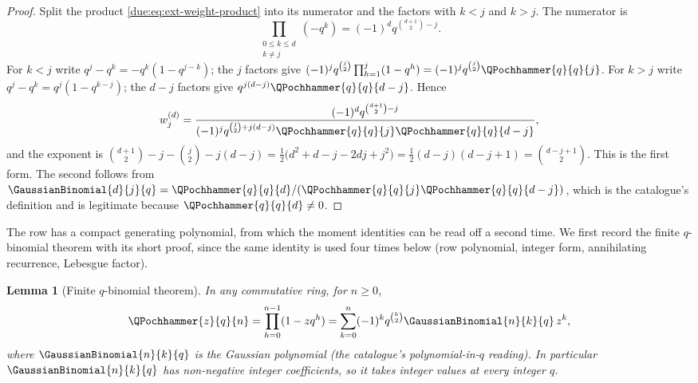 \documentclass[11pt,oneside]{article}
\theoremstyle{plain}
\newtheorem{lemma}[theorem]{Lemma}
\theoremstyle{definition}
\theoremstyle{remark}
\newcommand{\Wrow}[2]{w^{(#1)}_{#2}}                        %
\begin{document}
\begin{proof}
Split the product \cref{due:eq:ext-weight-product} into its numerator and the
factors with $k<j$ and $k>j$.  The numerator is
\[
 \prod_{\substack{0\le k\le d\\k\neq j}}(-q^{k})
 =(-1)^{d}q^{\binom{d+1}{2}-j}.
\]
For $k<j$ write $q^{j}-q^{k}=-q^{k}(1-q^{j-k})$; the $j$ factors give
$(-1)^{j}q^{\binom{j}{2}}\prod_{h=1}^{j}(1-q^{h})
=(-1)^{j}q^{\binom{j}{2}}\QPochhammer{q}{q}{j}$.
For $k>j$ write $q^{j}-q^{k}=q^{j}(1-q^{k-j})$; the $d-j$ factors give
$q^{j(d-j)}\QPochhammer{q}{q}{d-j}$.  Hence
\[
 \Wrow{d}{j}
 =\frac{(-1)^{d}q^{\binom{d+1}{2}-j}}
       {(-1)^{j}q^{\binom{j}{2}+j(d-j)}\QPochhammer{q}{q}{j}\QPochhammer{q}{q}{d-j}},
\]
and the exponent is
$\binom{d+1}{2}-j-\binom{j}{2}-j(d-j)
=\tfrac12\bigl(d^{2}+d-j-2dj+j^{2}\bigr)
=\tfrac12(d-j)(d-j+1)=\binom{d-j+1}{2}$.
This is the first form.  The second follows from
$\GaussianBinomial{d}{j}{q}
=\QPochhammer{q}{q}{d}/(\QPochhammer{q}{q}{j}\QPochhammer{q}{q}{d-j})$,
which is the catalogue's definition and is legitimate because
$\QPochhammer{q}{q}{d}\ne0$.
\end{proof}

The row has a compact generating polynomial, from which the moment identities
can be read off a second time.  We first record the finite $q$-binomial
theorem with its short proof, since the same identity is used four times
below (row polynomial, integer form, annihilating recurrence, Lebesgue factor).

\begin{lemma}[Finite $q$-binomial theorem]
\label{due:lem:ext-qbinomial}
In any commutative ring, for $n\ge0$,
\begin{equation}
 \QPochhammer{z}{q}{n}=\prod_{h=0}^{n-1}(1-zq^{h})
 =\sum_{k=0}^{n}(-1)^{k}q^{\binom{k}{2}}\GaussianBinomial{n}{k}{q}\,z^{k},
 \label{due:eq:ext-qbinomial}
\end{equation}
where $\GaussianBinomial{n}{k}{q}$ is the Gaussian polynomial (the catalogue's
polynomial-in-$q$ reading).  In particular $\GaussianBinomial{n}{k}{q}$ has
non-negative integer coefficients, so it takes integer values at every
integer $q$.
\end{lemma}
\end{document}
